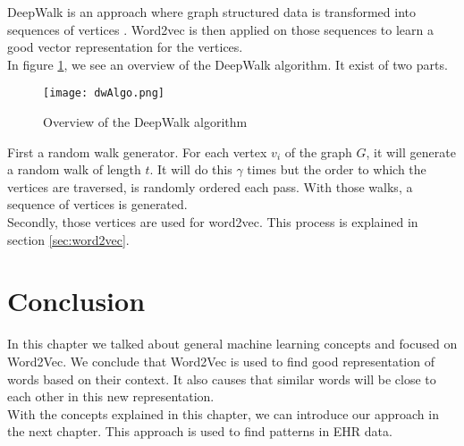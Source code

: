 DeepWalk is an approach where graph structured data is transformed into sequences of vertices \cite{deepwalkMain:article}. Word2vec is then applied on those sequences to learn a good vector representation for the vertices. \\

In figure \ref{fig:dwAlgo}, we see an overview of the DeepWalk algorithm. It exist of two parts. 

\begin{figure}[H]
	\centering
	\texttt{[image: dwAlgo.png]}
	\caption{Overview of the DeepWalk algorithm \cite{deepwalkMain:article}}
	\label{fig:dwAlgo}
\end{figure} 

First a random walk generator. For each vertex $v_i$ of the graph $G$, it will generate a random walk of length $t$. It will do this $\gamma$ times but the order to which the vertices are traversed, is randomly ordered each pass. With those walks, a sequence of vertices is generated. \\
Secondly, those vertices are used for word2vec. This process is explained in section \ref{sec:word2vec}.


\section{Conclusion}
In this chapter we talked about general machine learning concepts and focused on Word2Vec. We conclude that Word2Vec is used to find good representation of words based on their context. It also causes that similar words will be close to each other in this new representation. \\

With the concepts explained in this chapter, we can introduce our approach in the next chapter. This approach is used to find patterns in EHR data.



